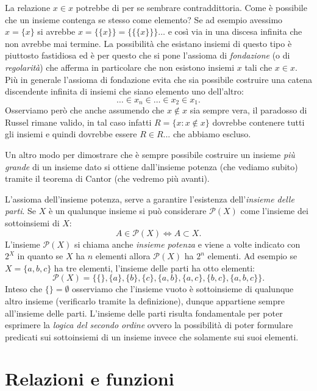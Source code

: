 \documentclass[italian,a4paper,hidelinks,headinclude]{scrartcl}
\renewcommand{\P}{{\mathcal P}}
\newcommand{\myemph}[1]{\emph{#1}\marginpar{#1}}
\begin{document}
La relazione $x\in x$ potrebbe di per se sembrare contraddittoria.
Come è possibile che un insieme contenga se stesso come elemento?
Se ad esempio avessimo $x=\{ x\}$ si avrebbe $x=\{\{x\}\} = \{\{\{ x\}\}\} \dots$
e così via in una discesa infinita che non avrebbe mai termine.
La possibilità che esistano insiemi di questo tipo è piuttosto fastidiosa ed è per questo
che si pone l'assioma di \emph{fondazione} (o di \emph{regolarità}) che afferma
in particolare che non esistono insiemi $x$ tali che $x\in x$.
Più in generale l'assioma di fondazione evita che sia possibile
costruire una catena discendente infinita di insiemi che siano
elemento uno dell'altro:
\[
  \dots \in x_n \in \dots \in x_2 \in x_1.
\]
Osserviamo però che anche assumendo che $x\not\in x$ sia sempre vera,
il paradosso di Russel rimane valido, in tal caso infatti
$R=\{x\colon x\not \in x\}$ dovrebbe contenere
tutti gli insiemi e quindi dovrebbe essere $R\in R$... che abbiamo escluso.

Un altro modo per dimostrare che è sempre possibile costruire un
insieme \emph{più grande} di un insieme dato si ottiene dall'insieme potenza
(che vediamo subito) tramite il teorema di Cantor (che vedremo più avanti).

L'assioma dell'insieme potenza, serve
a garantire l'esistenza del\-l'\myemph{insieme delle parti}.
Se $X$ è un qualunque insieme si può considerare $\P(X)$ come l'insieme dei
sottoinsiemi di $X$:
\[
 A \in \P(X) \iff A \subset X.
\]
L'insieme $\P(X)$ si chiama anche \emph{insieme potenza} e viene a volte indicato con $2^X$
in quanto se $X$ ha $n$ elementi allora $\P(X)$ ha $2^n$ elementi.
Ad esempio se $X=\{a, b, c\}$ ha tre elementi, l'insieme delle parti
ha otto elementi:
\[
 \P(X) = \{ \{\}, \{a\}, \{b\}, \{c\}, \{a,b\},
   \{a,c\}, \{b,c\}, \{a,b,c\}\}.
\]
Inteso che $\{\}=\emptyset$ osserviamo che l'insieme vuoto è sottoinsieme di
qualunque altro insieme (verificarlo tramite la definizione),
dunque appartiene sempre all'insieme delle parti.
L'insieme delle parti risulta fondamentale per poter esprimere
la \emph{logica del secondo ordine} ovvero la possibilità di poter
formulare predicati sui sottoinsiemi di un insieme invece che solamente
sui suoi elementi.

\section{Relazioni e funzioni}
\end{document}
